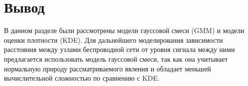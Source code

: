 \section{Вывод}

В данном разделе были рассмотрены модели гауссовой смеси (GMM) и модели оценки плотности (KDE). Для дальнейшего моделирования зависимости расстояния между узлами беспроводной сети от уровня сигнала между ними предлагается использовать модель гауссовой смеси, так как она учитывает нормальную природу рассматриваемого явления и обладает меньшей вычислительной сложностью по сравнению с KDE.



